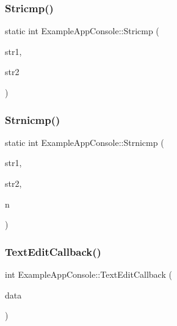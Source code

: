 \subsubsection{\texorpdfstring{Stricmp()}{Stricmp()}}
{\footnotesize\ttfamily static int Example\+App\+Console\+::\+Stricmp (\begin{DoxyParamCaption}\item[{const char $\ast$}]{str1,  }\item[{const char $\ast$}]{str2 }\end{DoxyParamCaption})\hspace{0.3cm}{\ttfamily [static]}}

\hypertarget{struct_example_app_console_a11bcb7a4b801e5eeb0c098c082fedc25}{}\label{struct_example_app_console_a11bcb7a4b801e5eeb0c098c082fedc25} 
\subsubsection{\texorpdfstring{Strnicmp()}{Strnicmp()}}
{\footnotesize\ttfamily static int Example\+App\+Console\+::\+Strnicmp (\begin{DoxyParamCaption}\item[{const char $\ast$}]{str1,  }\item[{const char $\ast$}]{str2,  }\item[{int}]{n }\end{DoxyParamCaption})\hspace{0.3cm}{\ttfamily [static]}}

\hypertarget{struct_example_app_console_aae97c81ddab660e6e0296c21844c4a7b}{}\label{struct_example_app_console_aae97c81ddab660e6e0296c21844c4a7b} 
\subsubsection{\texorpdfstring{Text\+Edit\+Callback()}{TextEditCallback()}}
{\footnotesize\ttfamily int Example\+App\+Console\+::\+Text\+Edit\+Callback (\begin{DoxyParamCaption}\item[{\hyperlink{struct_im_gui_text_edit_callback_data}{Im\+Gui\+Text\+Edit\+Callback\+Data} $\ast$}]{data }\end{DoxyParamCaption})}

